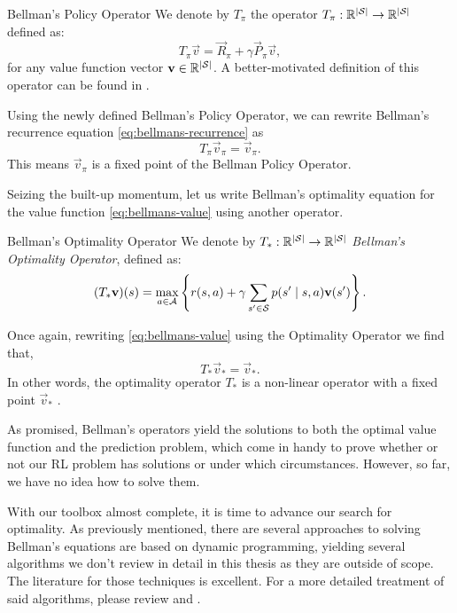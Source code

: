 \begin{dfn}{Bellman's Policy Operator}{}
    We denote by $T_\pi$ the operator $T_\pi: \mathbb{R}^{|\mathcal{S}|} \to \mathbb{R}^{|\mathcal{S}|}$
    defined as:
    \begin{equation*}
        T_\pi \vec{v} = \vec{R}_\pi + \gamma \vec{P}_\pi \vec{v},
    \end{equation*}
    for any value function vector $\mathbf{v} \in \mathbb{R}^{|\mathcal{S}|}$. A
    better-motivated definition of this operator can be found in
    \cite[Ch.~5.4]{raoRL4F}.
\end{dfn}

Using the newly defined Bellman's Policy Operator, we can rewrite Bellman's
recurrence equation \eqref{eq:bellmans-recurrence} as
\begin{equation*}
    T_\pi \vec{v}_\pi = \vec{v}_\pi.
\end{equation*}
This means $\vec{v}_\pi$ is a fixed point of the Bellman Policy Operator.

Seizing the built-up momentum, let us write Bellman's optimality equation for
the value function \eqref{eq:bellmans-value} using another operator.

\begin{dfn}{Bellman's Optimality Operator}{}
    We denote by $T_*: \mathbb{R}^{|\mathcal{S}|} \to \mathbb{R}^{|\mathcal{S}|}$ \emph{Bellman's Optimality Operator}, defined as:
    \begin{equation*}
        (T_{*} \mathbf{v})(s) = \max_{a \in \mathcal{A}} \left\{ r(s, a) + \gamma \sum_{s' \in \mathcal{S}} p(s' \mid s, a) \mathbf{v}(s') \right\}. 
    \end{equation*}
\end{dfn}

Once again, rewriting \eqref{eq:bellmans-value} using the Optimality Operator we
find that,
\begin{equation}
    \label{eq:bellmans-optimality-operators}
    T_* \vec{v}_{*} = \vec{v}_{*}.
\end{equation}
In other words, the optimality operator $T_*$ is a non-linear operator with a
fixed point $\vec{v}_*$ \cite[Lect. Jan 15 2019]{raoRL4F}.

As promised, Bellman's operators yield the solutions to both the optimal value
function and the prediction problem, which come in handy to prove whether or
not our RL problem has solutions or under which circumstances. However, so far,
we have no idea how to solve them.

With our toolbox almost complete, it is time to advance our search for
optimality. As previously mentioned, there are several approaches to solving
Bellman's equations are based on dynamic programming, yielding several
algorithms we don't review in detail in this thesis as they are outside of
scope. The literature for those techniques is excellent. For a more detailed
treatment of said algorithms, please review \cite{SuttonBarto} and
\cite{raoRL4F}.

